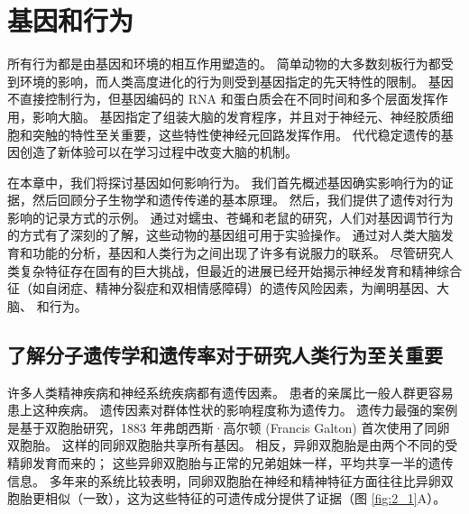 \chapter{基因和行为} \label{chap:chap2}
所有行为都是由基因和环境的相互作用塑造的。 
简单动物的大多数刻板行为都受到环境的影响，而人类高度进化的行为则受到基因指定的先天特性的限制。 
基因不直接控制行为，但基因编码的 RNA 和蛋白质会在不同时间和多个层面发挥作用，影响大脑。 
基因指定了组装大脑的发育程序，并且对于神经元、神经胶质细胞和突触的特性至关重要，这些特性使神经元回路发挥作用。 
代代稳定遗传的基因创造了新体验可以在学习过程中改变大脑的机制。


在本章中，我们将探讨基因如何影响行为。 
我们首先概述基因确实影响行为的证据，然后回顾分子生物学和遗传传递的基本原理。 
然后，我们提供了遗传对行为影响的记录方式的示例。
通过对蠕虫、苍蝇和老鼠的研究，人们对基因调节行为的方式有了深刻的了解，这些动物的基因组可用于实验操作。 
通过对人类大脑发育和功能的分析，基因和人类行为之间出现了许多有说服力的联系。 
尽管研究人类复杂特征存在固有的巨大挑战，但最近的进展已经开始揭示神经发育和精神综合征（如自闭症、精神分裂症和双相情感障碍）的遗传风险因素，为阐明基因、大脑、 和行为。


\section{了解分子遗传学和遗传率对于研究人类行为至关重要}

许多人类精神疾病和神经系统疾病都有遗传因素。 
患者的亲属比一般人群更容易患上这种疾病。 
遗传因素对群体性状的影响程度称为遗传力。 
遗传力最强的案例是基于双胞胎研究，1883 年弗朗西斯·高尔顿 (Francis Galton) 首次使用了同卵双胞胎。 这样的同卵双胞胎共享所有基因。 
相反，异卵双胞胎是由两个不同的受精卵发育而来的； 这些异卵双胞胎与正常的兄弟姐妹一样，平均共享一半的遗传信息。 
多年来的系统比较表明，同卵双胞胎在神经和精神特征方面往往比异卵双胞胎更相似（一致），这为这些特征的可遗传成分提供了证据（图 \ref{fig:2_1}A）。

